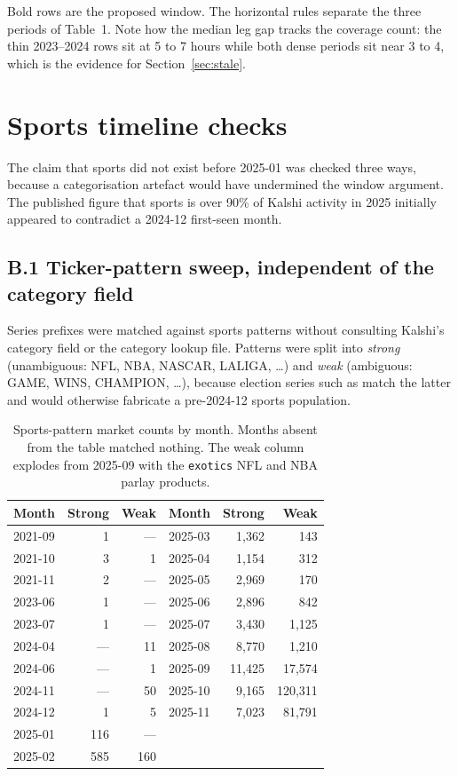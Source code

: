 \documentclass[11pt,a4paper]{article}
\begin{document}
\noindent Bold rows are the proposed window. The horizontal rules separate the
three periods of Table~1. Note how the median leg gap tracks the coverage
count: the thin 2023--2024 rows sit at 5 to 7 hours while both dense periods
sit near 3 to 4, which is the evidence for Section~\ref{sec:stale}.

\section{Sports timeline checks}
\label{app:sports}

The claim that sports did not exist before 2025-01 was checked three ways,
because a categorisation artefact would have undermined the window argument.
The published figure that sports is over 90\% of Kalshi activity in 2025
initially appeared to contradict a 2024-12 first-seen month.

\subsection*{B.1 Ticker-pattern sweep, independent of the category field}

Series prefixes were matched against sports patterns without consulting
Kalshi's category field or the category lookup file. Patterns were split into
\emph{strong} (unambiguous: NFL, NBA, NASCAR, LALIGA, \ldots) and \emph{weak}
(ambiguous: GAME, WINS, CHAMPION, \ldots), because election series such as
 match the latter and would otherwise fabricate a
pre-2024-12 sports population.

\begin{table}[ht]
\centering\small
\begin{tabular}{lrr@{\hskip 1.2cm}lrr}
\toprule
Month & Strong & Weak & Month & Strong & Weak \\
\midrule
2021-09 & 1 & --- & 2025-03 & 1,362 & 143 \\
2021-10 & 3 & 1 & 2025-04 & 1,154 & 312 \\
2021-11 & 2 & --- & 2025-05 & 2,969 & 170 \\
2023-06 & 1 & --- & 2025-06 & 2,896 & 842 \\
2023-07 & 1 & --- & 2025-07 & 3,430 & 1,125 \\
2024-04 & --- & 11 & 2025-08 & 8,770 & 1,210 \\
2024-06 & --- & 1 & 2025-09 & 11,425 & 17,574 \\
2024-11 & --- & 50 & 2025-10 & 9,165 & 120,311 \\
2024-12 & 1 & 5 & 2025-11 & 7,023 & 81,791 \\
2025-01 & 116 & --- & & & \\
2025-02 & 585 & 160 & & & \\
\bottomrule
\end{tabular}
\caption{Sports-pattern market counts by month. Months absent from the table
matched nothing. The weak column explodes from 2025-09 with the
\texttt{exotics} NFL and NBA parlay products.}
\end{table}
\end{document}

